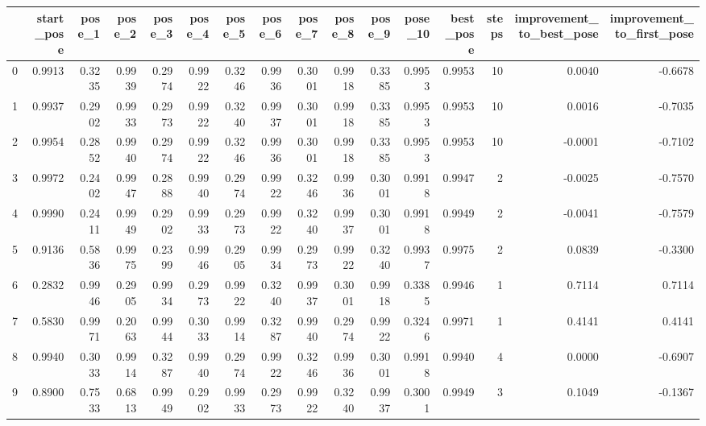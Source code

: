 \begin{tabular}{lrrrrrrrrrrrrrrr}
\toprule
{} &  start\_pose &  pose\_1 &  pose\_2 &  pose\_3 &  pose\_4 &  pose\_5 &  pose\_6 &  pose\_7 &  pose\_8 &  pose\_9 &  pose\_10 &  best\_pose &  steps &  improvement\_to\_best\_pose &  improvement\_to\_first\_pose \\
\midrule
0  &      0.9913 &  0.3235 &  0.9939 &  0.2974 &  0.9922 &  0.3246 &  0.9936 &  0.3001 &  0.9918 &  0.3385 &   0.9953 &     0.9953 &     10 &                    0.0040 &                    -0.6678 \\
1  &      0.9937 &  0.2902 &  0.9933 &  0.2973 &  0.9922 &  0.3240 &  0.9937 &  0.3001 &  0.9918 &  0.3385 &   0.9953 &     0.9953 &     10 &                    0.0016 &                    -0.7035 \\
2  &      0.9954 &  0.2852 &  0.9940 &  0.2974 &  0.9922 &  0.3246 &  0.9936 &  0.3001 &  0.9918 &  0.3385 &   0.9953 &     0.9953 &     10 &                   -0.0001 &                    -0.7102 \\
3  &      0.9972 &  0.2402 &  0.9947 &  0.2888 &  0.9940 &  0.2974 &  0.9922 &  0.3246 &  0.9936 &  0.3001 &   0.9918 &     0.9947 &      2 &                   -0.0025 &                    -0.7570 \\
4  &      0.9990 &  0.2411 &  0.9949 &  0.2902 &  0.9933 &  0.2973 &  0.9922 &  0.3240 &  0.9937 &  0.3001 &   0.9918 &     0.9949 &      2 &                   -0.0041 &                    -0.7579 \\
5  &      0.9136 &  0.5836 &  0.9975 &  0.2399 &  0.9946 &  0.2905 &  0.9934 &  0.2973 &  0.9922 &  0.3240 &   0.9937 &     0.9975 &      2 &                    0.0839 &                    -0.3300 \\
6  &      0.2832 &  0.9946 &  0.2905 &  0.9934 &  0.2973 &  0.9922 &  0.3240 &  0.9937 &  0.3001 &  0.9918 &   0.3385 &     0.9946 &      1 &                    0.7114 &                     0.7114 \\
7  &      0.5830 &  0.9971 &  0.2063 &  0.9944 &  0.3033 &  0.9914 &  0.3287 &  0.9940 &  0.2974 &  0.9922 &   0.3246 &     0.9971 &      1 &                    0.4141 &                     0.4141 \\
8  &      0.9940 &  0.3033 &  0.9914 &  0.3287 &  0.9940 &  0.2974 &  0.9922 &  0.3246 &  0.9936 &  0.3001 &   0.9918 &     0.9940 &      4 &                    0.0000 &                    -0.6907 \\
9  &      0.8900 &  0.7533 &  0.6813 &  0.9949 &  0.2902 &  0.9933 &  0.2973 &  0.9922 &  0.3240 &  0.9937 &   0.3001 &     0.9949 &      3 &                    0.1049 &                    -0.1367 \\

\end{tabular}
